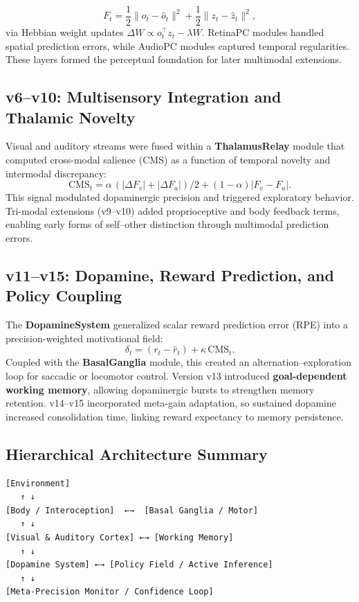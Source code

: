\documentclass[9pt]{elife}
\begin{document}
\[
F_t = \frac{1}{2}\|o_t - \hat{o}_t\|^2 + \frac{1}{2}\|z_t - \hat{z}_t\|^2 ,
\]
via Hebbian weight updates
$\Delta W \propto o_t^\top z_t - \lambda W$.
RetinaPC modules handled spatial prediction errors,
while AudioPC modules captured temporal regularities.
These layers formed the perceptual foundation for later multimodal extensions.

\subsection{v6–v10: Multisensory Integration and Thalamic Novelty}

Visual and auditory streams were fused within a \textbf{ThalamusRelay} module that computed
cross-modal salience (CMS) as a function of temporal novelty and intermodal discrepancy:
\[
\mathrm{CMS}_t = \alpha \, (|\Delta F_v| + |\Delta F_a|)/2 + (1-\alpha)|F_v - F_a|.
\]
This signal modulated dopaminergic precision and triggered exploratory behavior.
Tri-modal extensions (v9–v10) added proprioceptive and body feedback terms,
enabling early forms of self–other distinction through multimodal prediction errors.

\subsection{v11–v15: Dopamine, Reward Prediction, and Policy Coupling}

The \textbf{DopamineSystem} generalized scalar reward prediction error (RPE)
into a precision-weighted motivational field:
\[
\delta_t = (r_t - \hat{r}_t) + \kappa \, \mathrm{CMS}_t .
\]
Coupled with the \textbf{BasalGanglia} module,
this created an alternation–exploration loop for saccadic or locomotor control.
Version v13 introduced \textbf{goal-dependent working memory},
allowing dopaminergic bursts to strengthen memory retention.
v14–v15 incorporated meta-gain adaptation,
so sustained dopamine increased consolidation time,
linking reward expectancy to memory persistence.

\subsection{Hierarchical Architecture Summary}

\begin{verbatim}
[Environment]
   ↑ ↓
[Body / Interoception]  ←→  [Basal Ganglia / Motor]
   ↑ ↓
[Visual & Auditory Cortex] ←→ [Working Memory]
   ↑ ↓
[Dopamine System] ←→ [Policy Field / Active Inference]
   ↑ ↓
[Meta-Precision Monitor / Confidence Loop]
\end{verbatim}
\end{document}
